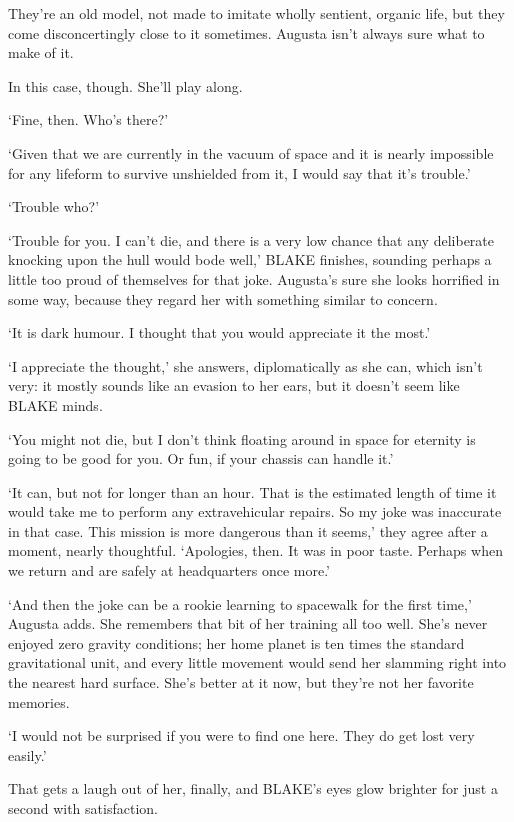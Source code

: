 They're an old model, not made to imitate wholly sentient, organic
life, but they come disconcertingly close to it sometimes. Augusta
isn't always sure what to make of it.

In this case, though. She'll play along.

`Fine, then. Who's there?'

`Given that we are currently in the vacuum of space and it is nearly
impossible for any lifeform to survive unshielded from it, I would say
that it's trouble.'

`Trouble \textellipsis who?'

`Trouble for you. I can't die, and there is a very low chance that any
deliberate knocking upon the hull would bode well,' BLAKE finishes,
sounding perhaps a little too proud of themselves for that
joke. Augusta's sure she looks horrified in some way, because they
regard her with something similar to concern.

`It is dark humour. I thought that you would appreciate it the
most.'

`I appreciate the thought,' she answers, diplomatically as she
can, which isn't very: it mostly sounds like an evasion to her ears,
but it doesn't seem like BLAKE minds.

`You might not die, but I don't think floating around in space for
eternity is going to be good for you. Or fun, if your chassis can
handle it.'

`It can, but not for longer than an hour. That is the estimated length
of time it would take me to perform any extravehicular repairs. So my
joke was inaccurate in that case. This mission is more dangerous than
it seems,' they agree after a moment, nearly thoughtful. `Apologies,
then. It was in poor taste. Perhaps when we return and are safely at
headquarters once more.'

`And then the joke can be a rookie learning to spacewalk for the first
time,' Augusta adds. She remembers that bit of her training all too
well. She's never enjoyed zero gravity conditions; her home planet is
ten times the standard gravitational unit, and every little movement
would send her slamming right into the nearest hard surface. She's
better at it now, but they're not her favorite memories.

`I would not be surprised if you were to find one here. They do get
lost very easily.'

That gets a laugh out of her, finally, and BLAKE's eyes glow brighter
for just a second with satisfaction.

